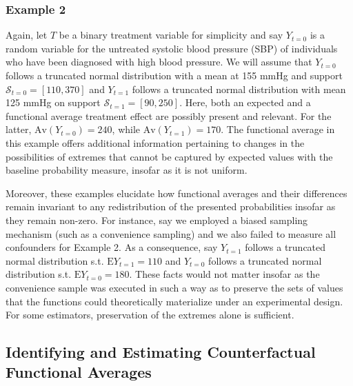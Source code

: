 \documentclass[12pt]{amsart}
\theoremstyle{plain}%
\theoremstyle{definition}
\theoremstyle{remark}
\numberwithin{equation}{section}
\begin{document}
\subsubsection{Example 2} Again, let $T$ be a binary treatment variable for simplicity and say $Y_{t=0}$ is a random variable for the untreated systolic blood pressure (SBP) of individuals who have been diagnosed with high blood pressure. We will assume that $Y_{t=0}$ follows a truncated normal distribution with a mean at 155 mmHg and support $\mathcal{S}_{t=0} = [110, 370]$ and $Y_{t=1}$ follows a truncated normal distribution with mean 125 mmHg on support $\mathcal{S}_{t=1} = [90, 250]$. Here, both an expected and a functional average treatment effect are possibly present and relevant. For the latter, $\text{Av}(Y_{t=0}) = 240$, while $\text{Av}(Y_{t=1}) = 170$. The functional average in this example offers additional information pertaining to changes in the possibilities of extremes that cannot be captured by expected values with the baseline probability measure, insofar as it is not uniform. 

Moreover, these examples elucidate how functional averages and their differences remain invariant to any redistribution of the presented probabilities insofar as they remain non-zero. For instance, say we employed a biased sampling mechanism (such as a convenience sampling) and we also failed to measure all confounders for Example 2. As a consequence, say $Y_{t=1}$ follows a truncated normal distribution s.t. $\text{E}Y_{t=1} = 110$ and $Y_{t=0}$ follows a truncated normal distribution s.t. $\text{E}Y_{t=0} = 180$. These facts would not matter insofar as the convenience sample was executed in such a way as to preserve the sets of values that the functions could theoretically materialize under an experimental design. For some estimators, preservation of the extremes alone is sufficient.

\subsection{Identifying and Estimating Counterfactual Functional Averages}
\end{document}
